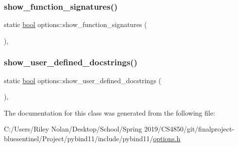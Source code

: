 \mbox{\label{classoptions_af2fa374b06da8ecfaa06beaf3bfac1a9}} 
\subsubsection{\texorpdfstring{show\_function\_signatures()}{show\_function\_signatures()}}
{\footnotesize\ttfamily static \mbox{\hyperlink{asdl_8h_af6a258d8f3ee5206d682d799316314b1}{bool}} options\+::show\+\_\+function\+\_\+signatures (\begin{DoxyParamCaption}{ }\end{DoxyParamCaption})\hspace{0.3cm}{\ttfamily [inline]}, {\ttfamily [static]}}

\mbox{\label{classoptions_af812a48c76ad251894b1483c131c8fe8}} 
\subsubsection{\texorpdfstring{show\_user\_defined\_docstrings()}{show\_user\_defined\_docstrings()}}
{\footnotesize\ttfamily static \mbox{\hyperlink{asdl_8h_af6a258d8f3ee5206d682d799316314b1}{bool}} options\+::show\+\_\+user\+\_\+defined\+\_\+docstrings (\begin{DoxyParamCaption}{ }\end{DoxyParamCaption})\hspace{0.3cm}{\ttfamily [inline]}, {\ttfamily [static]}}



The documentation for this class was generated from the following file\+:\begin{DoxyCompactItemize}
\item 
C\+:/\+Users/\+Riley Nolan/\+Desktop/\+School/\+Spring 2019/\+C\+S4850/git/finalproject-\/bluesentinel/\+Project/pybind11/include/pybind11/\mbox{\hyperlink{options_8h}{options.\+h}}\end{DoxyCompactItemize}
